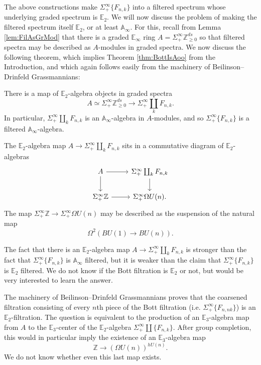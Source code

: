 The above constructions make $\Sigma^{\infty}_+ \{F_{n,k}\}$ into a filtered spectrum whose underlying graded spectrum is $\mathbb{E}_2$.  We will now discuss the problem of making the filtered spectrum itself $\mathbb{E}_2$, or at least $\mathbb{A}_\infty$.  For this, recall from Lemma \ref{lem:FilAsGrMod} that there is a graded $\mathbb{E}_\infty$ ring $A=\Sigma^{\infty}_+ \mathbb{Z}^{ds}_{\ge 0}$ so that filtered spectra may be described as $A$-modules in graded spectra.  We now discuss the following theorem, which implies Theorem \ref{thm:BottIsAoo} from the Introduction, and which again follows easily from the machinery of Beilinson--Drinfeld Grassmannians:

\begin{thm} \label{thm:AooFil}
There is a map of $\mathbb{E}_2$-algebra objects in graded spectra
$$A \simeq \Sigma^{\infty}_+ \mathbb{Z}^{ds}_{\ge 0} \longrightarrow \Sigma^{\infty}_+ \coprod_k F_{n,k}.$$
In particular, $\Sigma^{\infty}_+ \coprod_k F_{n,k}$ is an $\mathbb{A}_\infty$-algebra in $A$-modules, and so $\Sigma^{\infty}_+ \{F_{n,k}\}$ is a filtered $\mathbb{A}_\infty$-algebra.
\end{thm}

\begin{rmk}
The $\mathbb{E}_2$-algebra map $A \rightarrow \Sigma^{\infty}_+ \coprod_k F_{n,k}$ sits in a commutative diagram of $\mathbb{E}_2$-algebras
$$
\begin{tikzcd}
A \arrow{d} \arrow{r} & \Sigma^{\infty}_+ \coprod_k F_{n,k} \arrow{d} \\
\Sigma^{\infty}_+ \mathbb{Z} \arrow{r} & \Sigma^{\infty}_+ \Omega U(n).
\end{tikzcd}
$$
The map $\Sigma^{\infty}_+ \mathbb{Z} \rightarrow \Sigma^{\infty}_+ \Omega U(n)$ may be described as the suspension of the natural map
$$\Omega^2(BU(1) \rightarrow BU(n)).$$
\end{rmk}

\begin{rmk} \label{rmk:E2fil}
The fact that there is an $\mathbb{E}_2$-algebra map $A \rightarrow \Sigma^{\infty}_+ \coprod_k F_{n,k}$ is stronger than the fact that $\Sigma^{\infty}_+ \{F_{n,k}\}$ is $\mathbb{A}_\infty$ filtered, but it is weaker than the claim that $\Sigma^{\infty}_+ \{F_{n,k}\}$ is $\mathbb{E}_2$ filtered.  We do not know if the Bott filtration is $\mathbb{E}_2$ or not, but would be very interested to learn the answer.

The machinery of Beilinson--Drinfeld Grassmannians proves that the coarsened filtration consisting of every $n$th piece of the Bott filtration (i.e. $\Sigma^{\infty}_+ \{F_{n,nk}\}$) is an $\mathbb{E}_2$-filtration.  The question is equivalent to the production of an $\mathbb{E}_3$-algebra map from $A$ to the $\mathbb{E}_3$-center of the $\mathbb{E}_2$-algebra $\Sigma^{\infty}_+ \coprod \{F_{n,k}\}$. 
After group completion, this would in particular imply the existence of an $\mathbb{E}_3$-algebra map
$$\mathbb{Z} \longrightarrow (\Omega U(n))^{hU(n)}.$$
We do not know whether even this last map exists.
\end{rmk}


